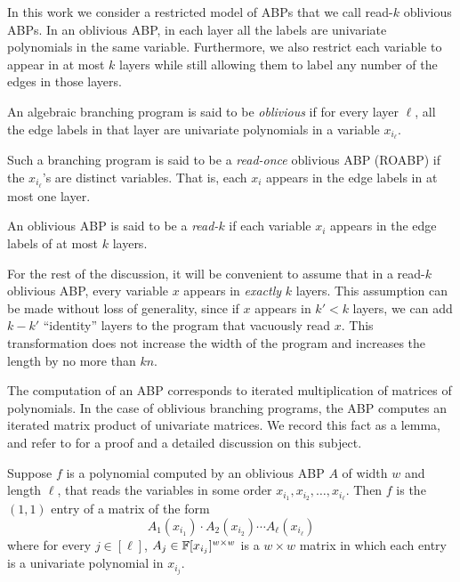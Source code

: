 \documentclass[11pt]{article}
\begin{document}
In this work we consider a restricted model of ABPs that we call read-$k$ oblivious ABPs.
In an oblivious ABP, in each layer all the labels are univariate polynomials in the same variable. Furthermore, we also restrict each variable to appear in at most $k$ layers while still allowing them to label any number of the edges in those layers. %

\begin{definition}
\label{defn:read-k-abp}
  An algebraic branching program is said to be \emph{oblivious} if for every layer $\ell$, all the edge labels in that layer are univariate polynomials in a variable $x_{i_\ell}$.

Such a branching program is said to be a \emph{read-once} oblivious ABP (ROABP) if the $x_{i_\ell}$'s are distinct variables.
That is, each $x_i$ appears in the edge labels in at most one layer.

An oblivious ABP is said to be a \emph{read-$k$} if each variable $x_i$ appears in the edge labels of at most $k$ layers. 
\end{definition}

\begin{remark}
\label{rem:exactly-k}
For the rest of the discussion, it will be convenient to assume that in a read-$k$ oblivious ABP, every variable $x$ appears in {\em exactly} $k$ layers. This assumption can be made without loss of generality, since if $x$ appears in $k' < k$ layers, we can add $k-k'$ ``identity'' layers to the program that vacuously read $x$. This transformation does not increase the width of the program and increases the length by no more than $kn$.
\end{remark}

The computation of an ABP corresponds to iterated multiplication of matrices of polynomials. In the case of oblivious branching programs, the ABP computes an iterated matrix product of univariate matrices. We record this fact as a lemma, and refer to \cite{forbesphdthesis} for a proof and a detailed discussion on this subject.

\begin{lemmawp}
\label{lem:obv-ABP}
Suppose $f$ is a polynomial computed by an oblivious ABP $A$ of width $w$ and length $\ell$, that reads the variables in some order $x_{i_1}, x_{i_2}, \ldots, x_{i_\ell}$. Then $f$ is the $(1,1)$ entry of a matrix of the form
\[
A_1(x_{i_1}) \cdot A_2(x_{i_2}) \cdots A_\ell(x_{i_\ell})
\]
where for every $j \in [\ell]$, $A_j \in \F[x_{i_j}]^{w \times w}$ is a $w \times w$ matrix in which each entry is a univariate polynomial in $x_{i_j}$.
\end{lemmawp}
\end{document}

